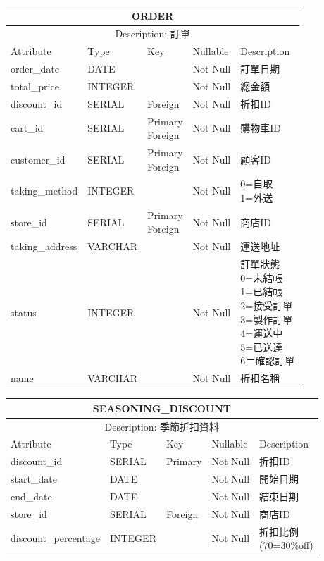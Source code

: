 \documentclass[a4paper, 12pt]{article}
\begin{document}
\noindent\begin{tabular}{ | p{7em} | p{5.5em} | p{5.5em} | p{4.5em} | p{11em} |}
  \hline
  \multicolumn{5}{|c|}{ORDER} \tabularnewline
  \hline 
  \multicolumn{5}{|c|}{Description: 訂單} \tabularnewline
  \hline 
  Attribute & Type & Key & Nullable & Description \\
  \hline
  order_date & DATE &  & Not Null & 訂單日期 \\
  \hline
  total_price & INTEGER &  & Not Null & 總金額 \\
  \hline
  discount_id & SERIAL & Foreign&Not Null &折扣ID\\
  \hline
  cart_id& SERIAL & \makecell[l]{Primary \\ Foreign} &Not Null &購物車ID\\
  \hline
  customer_id & SERIAL & \makecell[l]{Primary \\ Foreign} & Not Null & 顧客ID \\
  \hline
  taking_method & INTEGER &  & Not Null &  \makecell[l]{0=自取\\1=外送}\\
  \hline
  store_id & SERIAL & \makecell[l]{Primary \\ Foreign} & Not Null & 商店ID \\
  \hline
  taking_address & VARCHAR &  & Not Null & 運送地址 \\
  \hline
  status & INTEGER &  & Not Null & \makecell[l]{訂單狀態\\0=未結帳\\1=已結帳\\2=接受訂單\\3=製作訂單\\4=運送中\\5=已送達\\6＝確認訂單} \\
  \hline
  
  name & VARCHAR &  &Not Null &折扣名稱\\
  \hline
\end{tabular}


\noindent\begin{tabular}{ | p{7em} | p{5.5em} | p{5.5em} | p{4.5em} | p{11em} |}
  \hline
  \multicolumn{5}{|c|}{SEASONING_DISCOUNT} \tabularnewline
  \hline 
  \multicolumn{5}{|c|}{Description: 季節折扣資料} \tabularnewline
  \hline 
  Attribute & Type & Key & Nullable & Description \\
  \hline
  discount_id & SERIAL & Primary & Not Null & 折扣ID \\
  \hline
  start_date & DATE &  & Not Null & 開始日期 \\
  \hline
  end_date & DATE & &Not Null &結束日期\\
  \hline
  store_id& SERIAL & Foreign &Not Null &商店ID\\
  \hline
  discount_percentage & INTEGER &  &Not Null &\makecell[l]{折扣比例\\(70=30\%off)}\\
  \hline
\end{tabular}
\end{document}
